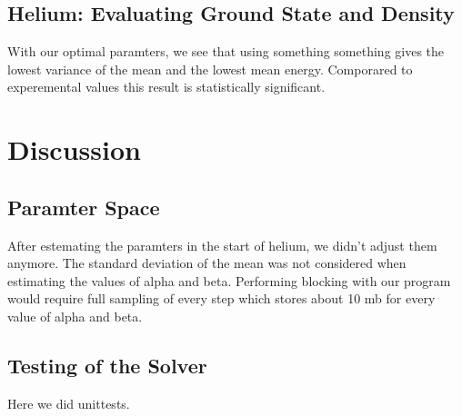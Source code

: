 \documentclass[twocolumn]{article}[12pt]
\begin{document}
\subsection{Helium: Evaluating Ground State and Density}
With our optimal paramters, we see that using something something gives the
lowest variance of the mean and the lowest mean energy. Comporared to experemental 
values this result is statistically significant. 


\section{Discussion}
\subsection{Paramter Space}
After estemating the paramters in the start of helium, we didn't adjust them anymore.
The standard deviation of the mean was not considered when estimating the values of 
alpha and beta. Performing blocking with our program would require full sampling
of every step which stores about 10 mb for every value of alpha and beta. 
\subsection{Testing of the Solver}
Here we did unittests. 
\end{document}
